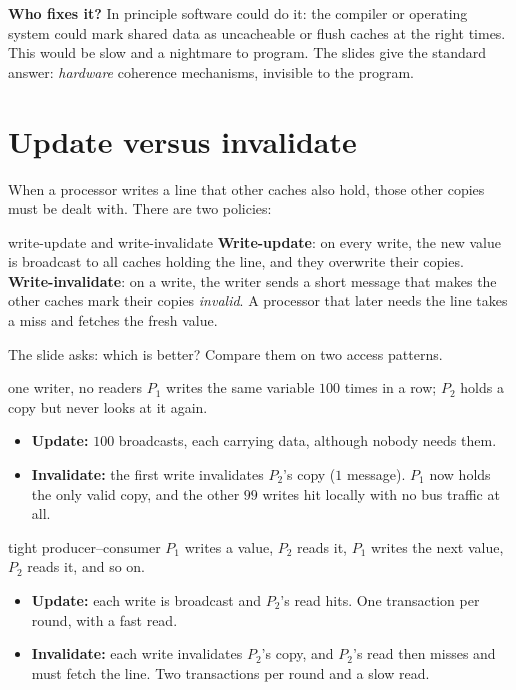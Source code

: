 \textbf{Who fixes it?} In principle software could do it: the compiler or operating system could mark shared data as uncacheable or
flush caches at the right times. This would be slow and a nightmare to program. The
slides give the standard answer: \emph{hardware} coherence mechanisms, invisible to the program.

\section{Update versus invalidate}

When a processor writes a line that other caches also hold, those other copies must be dealt with. There are two policies:

\begin{definition}{write-update and write-invalidate}
\textbf{Write-update}: on every write, the new value is broadcast to all caches holding the line, and they
overwrite their copies. \\
\textbf{Write-invalidate}: on a write, the writer sends a short message that makes the other caches mark their copies
\emph{invalid}. A processor that later needs the line takes a miss and fetches the fresh value.
\end{definition}

The slide asks: which is better? Compare them on two access patterns.

\begin{workedex}{one writer, no readers}
$P_1$ writes the same variable $100$ times in a row; $P_2$ holds a copy but never looks at it again.
\begin{itemize}
  \item \textbf{Update:} $100$ broadcasts, each carrying data, although nobody needs them.
  \item \textbf{Invalidate:} the first write invalidates $P_2$'s copy ($1$ message). $P_1$ now holds the only valid copy,
        and the other $99$ writes hit locally with no bus traffic at all.
\end{itemize}
\end{workedex}

\begin{workedex}{tight producer--consumer}
$P_1$ writes a value, $P_2$ reads it, $P_1$ writes the next value, $P_2$ reads it, and so on.
\begin{itemize}
  \item \textbf{Update:} each write is broadcast and $P_2$'s read hits. One transaction per round, with a fast read.
  \item \textbf{Invalidate:} each write invalidates $P_2$'s copy, and $P_2$'s read then misses and must fetch the line.
        Two transactions per round and a slow read.
\end{itemize}
\end{workedex}

